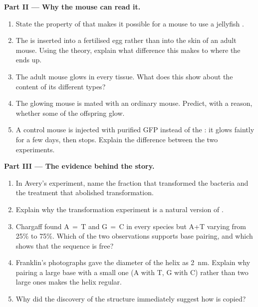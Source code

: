 \begin{problem}
\medskip
\noindent\textbf{Part II --- Why the mouse can read it.}
\begin{enumerate}[resume]
  \item State the property of  that makes it possible for a mouse
         to use a jellyfish .
  \item The  is inserted into a fertilised egg rather than into
        the skin of an adult mouse. Using the  theory, explain what
        difference this makes to where the  ends up.
  \item The adult mouse glows in every tissue. What does this show
        about the  content of its different  types?
  \item The glowing mouse is mated with an ordinary mouse. Predict,
        with a reason, whether some of the offspring glow.
  \item A control mouse is injected with purified GFP  instead
        of the : it glows faintly for a few days, then stops.
        Explain the difference between the two experiments.
\end{enumerate}

\medskip
\noindent\textbf{Part III --- The evidence behind the story.}
\begin{enumerate}[resume]
  \item In Avery's experiment, name the fraction that transformed the
        bacteria and the treatment that abolished transformation.
  \item Explain why the transformation experiment is a natural version
        of .
  \item Chargaff found A$\,=\,$T and G$\,=\,$C in every species but
        A+T varying from 25\% to 75\%. Which of the two observations
        supports base pairing, and which shows that the sequence is
        free?
  \item Franklin's photographs gave the diameter of the helix as
        \qty{2}{nm}. Explain why pairing a large base with a small one
        (A with T, G with C) rather than two large ones makes the
        helix regular.
  \item Why did the discovery of the structure immediately suggest how
         is copied?
\end{enumerate}


\end{problem}
